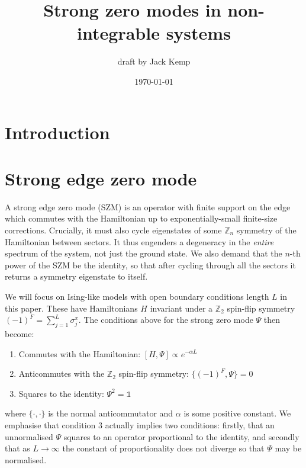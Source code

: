 \documentclass [a4paper, 11pt]{article}
\begin{document}
\title{Strong zero modes in non-integrable systems}
\author{draft by Jack Kemp}
\date{\today}
\maketitle

\begin{abstract}

\end{abstract}
 
\section{Introduction}

\section{Strong edge zero mode}
A strong edge zero mode (SZM) is an operator with finite support on the edge which commutes with the Hamiltonian up to exponentially-small finite-size corrections. Crucially, it must also cycle eigenstates of some $\mathbb{Z}_n$ symmetry of the Hamiltonian between sectors. It thus engenders a degeneracy in the \textit{entire} spectrum of the system, not just the ground state. We also demand that the $n$-th power of the SZM be the identity, so that after cycling through all the sectors it returns a symmetry eigenstate to itself.

We will focus on Ising-like models with open boundary conditions length $L$ in this paper. These have Hamiltonians $H$ invariant under a  $\mathbb{Z}_2$ spin-flip symmetry $(-1)^F = \sum_{j=1}^L \sigma^x_j$. The conditions above for the strong zero mode $\Psi$ then become: 
\begin{enumerate}
\item Commutes with the Hamiltonian: $[H,\Psi] \propto e^{-\alpha L}$
\item Anticommutes with the $\mathbb{Z}_2$ spin-flip symmetry:   $\{(-1)^F, \Psi\} = 0$
\item Squares to the identity: $\Psi^2 = \mathbb{1}$
\end{enumerate} where $\{\cdot,\cdot\}$ is the normal anticommutator and $\alpha$ is some positive constant. We emphasise that condition 3 actually implies two conditions: firstly, that an unnormalised $\Psi$ squares to an operator proportional to the identity, and secondly that as $L \to \infty$ the constant of proportionality does not diverge so that $\Psi$ may be normalised.
\end{document}
